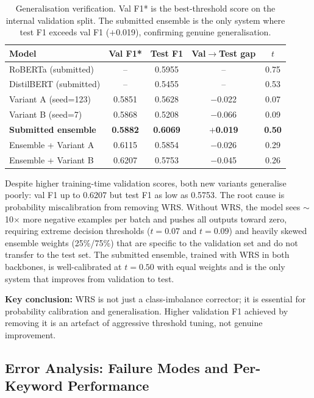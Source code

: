 \documentclass[11pt]{article}
\begin{document}
\begin{table}[H]
\centering
\begin{tabular}{lcccc}
\toprule
Model & Val F1* & Test F1 & Val$\to$Test gap & $t$ \\
\midrule
RoBERTa (submitted)    & --     & 0.5955 & --       & 0.75 \\
DistilBERT (submitted) & --     & 0.5455 & --       & 0.53 \\
Variant A (seed=123)   & 0.5851 & 0.5628 & $-$0.022 & 0.07 \\
Variant B (seed=7)     & 0.5868 & 0.5208 & $-$0.066 & 0.09 \\
\midrule
\textbf{Submitted ensemble}   & \textbf{0.5882} & \textbf{0.6069} & \textbf{$+$0.019} & \textbf{0.50} \\
Ensemble + Variant A          & 0.6115 & 0.5854 & $-$0.026 & 0.29 \\
Ensemble + Variant B          & 0.6207 & 0.5753 & $-$0.045 & 0.26 \\
\bottomrule
\end{tabular}
\caption{Generalisation verification. Val F1* is the best-threshold score on the internal validation split. The submitted ensemble is the only system where test F1 exceeds val F1 ($+$0.019), confirming genuine generalisation.}
\label{tab:gen_verify}
\end{table}

Despite higher training-time validation scores, both new variants generalise poorly: val F1 up to 0.6207 but test F1 as low as 0.5753. The root cause is probability miscalibration from removing WRS. Without WRS, the model sees $\sim$10$\times$ more negative examples per batch and pushes all outputs toward zero, requiring extreme decision thresholds ($t=0.07$ and $t=0.09$) and heavily skewed ensemble weights (25\%/75\%) that are specific to the validation set and do not transfer to the test set. The submitted ensemble, trained with WRS in both backbones, is well-calibrated at $t=0.50$ with equal weights and is the only system that improves from validation to test.

\textbf{Key conclusion:} WRS is not just a class-imbalance corrector; it is essential for probability calibration and generalisation. Higher validation F1 achieved by removing it is an artefact of aggressive threshold tuning, not genuine improvement.

\clearpage
\subsection{Error Analysis: Failure Modes and Per-Keyword Performance}
\label{sec:errors}
\end{document}
